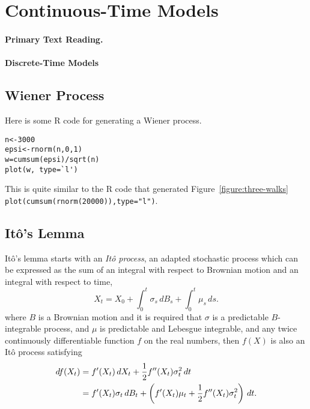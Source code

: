 \section{Continuous-Time Models}
\paragraph{Primary Text Reading.} 

\paragraph{Discrete-Time Models}

\subsection{Wiener Process}

Here is some R code for generating a Wiener process.
\begin{verbatim}
n<-3000
epsi<-rnorm(n,0,1)
w=cumsum(epsi)/sqrt(n)
plot(w, type=`l')
\end{verbatim}
This is quite similar to the R code that generated Figure~\ref{figure:three-walks} \\ \texttt{plot(cumsum(rnorm(20000)),type="l")}.
\subsection{It\^{o}'s Lemma}

It\^{o}'s lemma starts with an \emph{It\^{o} process}, an adapted stochastic process which can be expressed as the sum of an integral with respect to Brownian motion and an integral with respect to time,
\begin{equation}
X_t=X_0+\int_0^t\sigma_s\,dB_s+\int_0^t\mu_s\,ds.
\label{eq:ito-process}
\end{equation}
where $B$ is a Brownian motion and it is required that $\sigma$ is a predictable $B$-integrable process, and $\mu$ is predictable and Lebesgue integrable, and any twice continuously differentiable function $f$ on the real numbers, then $f(X)$ is also an It\^{o} process satisfying
\begin{align}
df(X_t) &= f^\prime(X_t)\,dX_t + \frac{1}{2}f^{\prime\prime}(X_t)\sigma^2_t\,dt \notag \\
&= f^\prime(X_t)\sigma_t\,dB_t + \left(f^\prime(X_t)\mu_t+\frac{1}{2}f^{\prime\prime}(X_t)\sigma^2_t\right)\,dt. \notag
\end{align}

